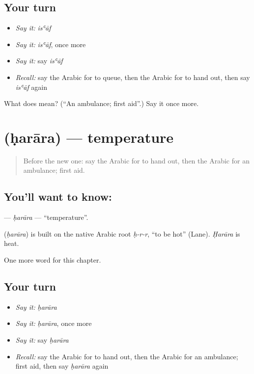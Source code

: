 \subsection*{Your turn}
\begin{itemize}
\raggedright
  \item \emph{Say it:} \emph{isʿāf}
  \item \emph{Say it:} \emph{isʿāf}, once more
  \item \emph{Say it:} say \emph{isʿāf}
  \item \emph{Recall:} say the Arabic for to queue, then the Arabic for to hand out, then say \emph{isʿāf} again
\end{itemize}

\begin{tcolorbox}[breakable,colback=teal!4,colframe=teal!35!black,title={Before you move on}]
What does  mean? (\textquotedblleft{}An ambulance; first aid\textquotedblright{}.) Say it once more.
\end{tcolorbox}
\section[\texorpdfstring{\ar{حرارة} (ḥarāra)}{حرارة (ḥarāra)}]{ (ḥarāra) — temperature}

\label{lesson:AR-C262-harara}



\begin{quote}
Before the new one: say the Arabic for to hand out, then the Arabic for an ambulance; first aid.
\end{quote}

\subsection*{You'll want to know: }
\textbf{} — \emph{ḥarāra} — \textquotedblleft{}temperature\textquotedblright{}.

\begin{cousinweb}
\textbf{} (\emph{ḥarāra}) is built on the native Arabic root \emph{ḥ-r-r}, \textquotedblleft{}to be hot\textquotedblright{} (Lane). \emph{Ḥarāra} is heat.
\end{cousinweb}

\begin{grammarlens}[title={What you've built}]
One more word for this chapter.
\end{grammarlens}

\subsection*{Your turn}
\begin{itemize}
\raggedright
  \item \emph{Say it:} \emph{ḥarāra}
  \item \emph{Say it:} \emph{ḥarāra}, once more
  \item \emph{Say it:} say \emph{ḥarāra}
  \item \emph{Recall:} say the Arabic for to hand out, then the Arabic for an ambulance; first aid, then say \emph{ḥarāra} again
\end{itemize}

